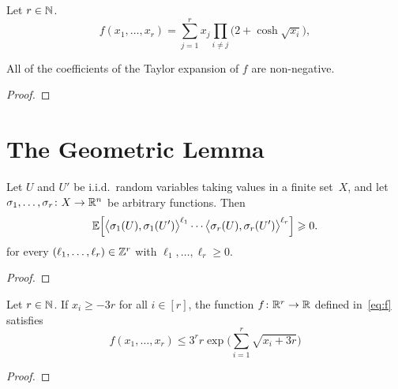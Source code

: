 \begin{definition}
  \label{def:f}
  Let $r \in \mathbb{N}$.
  \begin{equation}\label{eq:f}
    f(x_1,\dots,x_r) = \sum_{j = 1}^r x_j \prod_{i \ne j} \big( 2 + \cosh\sqrt{x_i} \big),
  \end{equation}
\end{definition}

\begin{lemma}
  \label{lem:taylor-nonneg}
  All of the coefficients of the Taylor expansion of $f$ are non-negative.
\end{lemma}
\begin{proof}
\end{proof}


\section{The Geometric Lemma}

\begin{lemma}
  \label{lem:moments}
  Let $U$ and\/ $U'$ be i.i.d.~random variables taking values in a finite set~$X$, and let\/ $\sigma_1,\ldots,\sigma_r \colon X \rightarrow \mathbb{R}^n$ be arbitrary functions. Then
  $$\mathbb{E}\Big[ \big\langle \sigma_1(U),\sigma_1(U') \big\rangle^{\ell_1} \cdots \big\langle \sigma_r(U),\sigma_r(U') \big\rangle^{\ell_r} \Big] \geqslant 0.$$
  for every $(\ell_1,\dots,\ell_r) \in \mathbb{Z}^r$ with $\ell_1,\dots,\ell_r \ge 0$.
\end{lemma}

\begin{proof}
\end{proof}


\begin{lemma}
  \label{lem:special-function-e}
  Let $r \in \mathbb{N}$. If $x_i \ge - 3r$ for all $i \in [r]$, the function $f \colon \mathbb{R}^r \rightarrow \mathbb{R}$ defined in~\eqref{eq:f} satisfies 
  $$ f(x_1,\dots,x_r) \le 3^r r \exp\bigg( \displaystyle\sum_{i = 1}^r \sqrt{ x_i + 3r } \bigg)$$
\end{lemma}
\begin{proof}
\end{proof}



